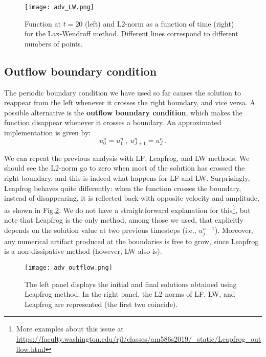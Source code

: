 \begin{figure}[h!]
    \centering
    \texttt{[image: adv\_LW.png]}
    \caption{\small Function at $t=20$ (left) and L2-norm as a function of time (right) for the Lax-Wendroff method. Different lines correspond to different numbers of points.}
    \label{fig:advection_LW}
\end{figure}




\vspace{4mm} 
\subsection{Outflow boundary condition} \label{advection_outflow}
The periodic boundary condition we have used so far causes the solution to reappear from the left whenever it crosses the right boundary, and vice versa. A possible alternative is the \textbf{outflow boundary condition}, which makes the function disappear whenever it crosses a boundary. An approximated implementation is given by: 
\begin{equation}
    u_0^n = u_1^n \:,\: u_{J+1}^n = u_J^n \:.
    \label{eq:outflow_bc}
\end{equation}

We can repeat the previous analysis with LF, Leapfrog, and LW methods. We should see the L2-norm go to zero when most of the solution has crossed the right boundary, and this is indeed what happens for LF and LW. Surprisingly, Leapfrog behaves quite differently: when the function crosses the boundary, instead of disappearing, it is reflected back with opposite velocity and amplitude, as shown in Fig.\ref{fig:advection_outflow}. We do not have a straightforward explanation for this\footnote{More examples about this issue at \url{https://faculty.washington.edu/rjl/classes/am586s2019/_static/Leapfrog_outflow.html}}, but note that Leapfrog is the only method, among those we used, that explicitly depends on the solution value at two previous timesteps (i.e., $u_j^{n-1}$). Moreover, any numerical artifact produced at the boundaries is free to grow, since Leapfrog is a non-dissipative method (however, LW also is).

\begin{figure}[h!]
    \centering
    \texttt{[image: adv\_outflow.png]}
    \caption{\small The left panel displays the initial and final solutions obtained using Leapfrog method. In the right panel, the L2-norms of LF, LW, and Leapfrog are represented (the first two coincide).}
    \label{fig:advection_outflow}
\end{figure}


